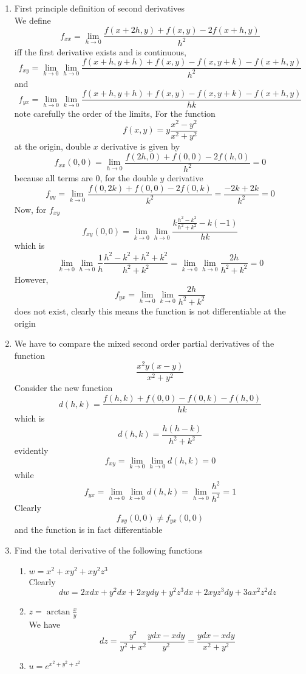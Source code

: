 \documentclass[12pt]{article}
\begin{document}
\begin{enumerate}
\item First principle definition of second derivatives \\
We define
$$
f_{xx} = \lim_{ h \to 0 } \frac{f(x + 2h,y) + f(x,y) - 2f(x + h,y)}{h^{2}}
$$
iff the first derivative exists and is continuous, 
$$
f_{xy} = \lim_{ k \to 0 } \lim_{ h \to 0 } \frac{f(x+h,y+h)+ f(x,y) - f(x,y+k) -f(x + h,y)}{h^{2}}
$$
and
$$
f_{yx} = \lim_{ h \to 0 } \lim_{ k \to 0 } \frac{f(x+h,y+h)+ f(x,y) - f(x,y+k) -f(x + h,y)}{hk}
$$
note carefully the order of the limits, 
For the function
$$
f(x,y) = y \frac{x^{2} -y^{2}}{x^{2} + y^{2}}
$$
at the origin, double $x$ derivative is given by
$$
f_{xx}(0,0) = \lim_{ h \to 0 } \frac{f(2h, 0) +f(0,0) -2f(h,0)}{h^{2}} = 0
$$
because all terms are 0, for the double $y$ derivative
$$
f_{yy} = \lim_{ k \to 0 } \frac{f(0,2k) + f(0,0)-2f(0,k)}{k^{2}} = \frac{-2k + 2k}{k^{2}} = 0
$$
Now, for $f_{xy}$
$$
f_{xy}(0,0) = \lim_{ k \to 0 } \lim_{ h \to 0 } \frac{k \frac{h^{2}-k^{2} }{h^{2} + k^{2}}-k(-1)}{hk}
$$
which is 
$$
\lim_{ k \to 0 } \lim_{ h \to 0 } \frac{1}{h}\frac{h^{2} -k^{2} + h^{2} + k^{2}}{h^{2} + k^{2}} = \lim_{ k \to 0 } \lim_{ h \to 0 } \frac{2h}{h^{2} + k^{2}} = 0
$$
However, 
$$
f_{yx} = \lim_{ h \to 0 } \lim_{ k \to 0 } \frac{2h}{h^{2} + k^{2}}
$$
does not exist, clearly this means the function is not differentiable at the origin
\item We have to compare the mixed second order partial derivatives of the function
$$
\frac{x^{2}y(x-y)}{x^{2} + y^{2}}
$$
Consider the new function
$$
d(h,k) = \frac{f(h,k) + f(0,0)-f(0,k)-f(h,0)}{hk}
$$
which is
$$
d(h,k) = \frac{h(h-k)}{h^{2} + k^{2}}
$$
evidently
$$
f_{xy} = \lim_{  k \to 0 } \lim_{ h \to 0 } d(h,k) = 0
$$
while
$$
f_{yx} = \lim_{ h \to 0 } \lim_{ k \to 0 } d(h,k) = \lim_{ h \to 0 } \frac{h^{2}}{h^{2}} = 1
$$
Clearly 
$$
f_{xy}(0,0) \neq f_{yx}(0,0)
$$
and the function is in fact differentiable
\item Find the total derivative of the following functions
\begin{enumerate}
\item $w = x^{2} + xy^{2} + xy^{2}z^{3}$ \\
Clearly
$$
dw = 2xdx + y^{2}dx + 2xydy + y^{2}z^{3}dx + 2xyz^{3} dy + 3ax^{2}z^{2} dz
$$
\item $z = \arctan \frac{x}{y}$ \\
We have
$$
dz = \frac{y^{2}}{y^{2} + x^{2}}\frac{ydx - xdy}{y^{2}} = \frac{ydx -xdy}{x^{2} + y^{2}}
$$
\item $u = e^{ x^{2} + y^{2} + z^{2} }$ \\

\end{enumerate}
\end{enumerate}
\end{document}
